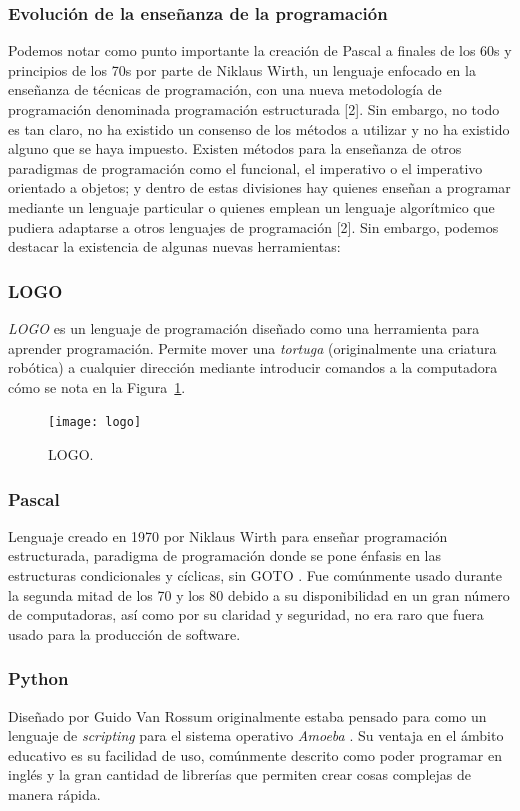 \subsubsection{Evolución de la enseñanza de la programación}
Podemos notar como punto importante la creación de Pascal a finales de los 60s y principios de los 70s por parte de Niklaus Wirth, un lenguaje enfocado en la enseñanza de técnicas de programación, con una nueva metodología de programación denominada programación estructurada [2]. Sin embargo, no todo es tan claro, no ha existido un consenso de los métodos a utilizar y no ha existido alguno que se haya impuesto. 
Existen métodos para la enseñanza de otros paradigmas de programación como el funcional, el imperativo o el imperativo orientado a objetos; y dentro de estas divisiones hay quienes enseñan a programar mediante un lenguaje particular o quienes emplean un lenguaje algorítmico que pudiera adaptarse a otros lenguajes de programación [2].
Sin embargo, podemos destacar la existencia de algunas nuevas herramientas:

\subsubsection{LOGO}
\textit{LOGO} es un lenguaje de programación diseñado como una herramienta para aprender programación. 
Permite mover una \textit{tortuga} (originalmente una criatura robótica) a cualquier dirección 
mediante introducir comandos a la computadora \cite{logo_history} cómo se nota en la Figura~\ref{fig:logo_scrn}.

\begin{figure}[ht]
    \centering
    \texttt{[image: logo]}
     \caption{LOGO.}
    \label{fig:logo_scrn}
\end{figure}

\subsubsection{Pascal}
Lenguaje creado en 1970 por Niklaus Wirth para enseñar programación estructurada, 
paradigma de programación donde se pone énfasis en las 
estructuras condicionales y cíclicas, sin GOTO \cite{pascal_history}. 
Fue comúnmente usado durante la segunda mitad de los 70 y los 80 
debido a su disponibilidad en un gran número de computadoras, 
así como por su claridad y seguridad, no era raro que fuera usado para la 
producción de software.

\subsubsection{Python}
Diseñado por Guido Van Rossum originalmente estaba pensado 
para como un lenguaje de \textit{scripting} para el sistema operativo \textit{Amoeba} \cite{python_history}. 
Su ventaja en el ámbito educativo es su facilidad de uso, comúnmente descrito 
como poder programar en inglés y la gran cantidad de librerías que permiten 
crear cosas complejas de manera rápida.

